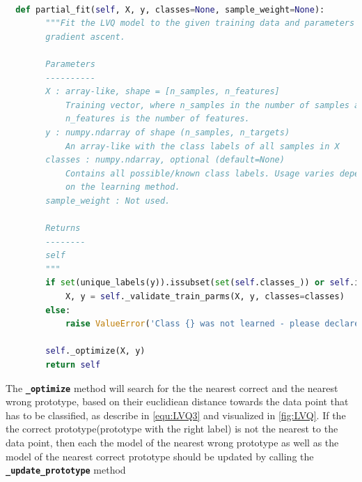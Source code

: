 \documentclass[12pt,oneside,a4paper,parskip]{scrbook}
\begin{document}
\begin{lstlisting}[label=lst:partialfit,
  language=python,
  firstnumber=1,
  caption=Method \texttt{partial\_fit} from the scikit-multiflow framework]			   

  def partial_fit(self, X, y, classes=None, sample_weight=None):
        """Fit the LVQ model to the given training data and parameters using
        gradient ascent.

        Parameters
        ----------
        X : array-like, shape = [n_samples, n_features]
            Training vector, where n_samples in the number of samples and
            n_features is the number of features.
        y : numpy.ndarray of shape (n_samples, n_targets)
            An array-like with the class labels of all samples in X
        classes : numpy.ndarray, optional (default=None)
            Contains all possible/known class labels. Usage varies depending
            on the learning method.
        sample_weight : Not used.

        Returns
        --------
        self
        """
        if set(unique_labels(y)).issubset(set(self.classes_)) or self.initial_fit is True:
            X, y = self._validate_train_parms(X, y, classes=classes)
        else:
            raise ValueError('Class {} was not learned - please declare all classes in first call of fit/partial_fit'.format(y))

        self._optimize(X, y)
        return self
\end{lstlisting}

The \textbf{\texttt{\_optimize}} method will search for the the nearest correct and the nearest wrong prototype, based on 
their euclidiean distance towards the data point that has to be classified, as describe in \ref{equ:LVQ3} and visualized in \ref{fig:LVQ}.
If the the correct prototype(prototype with the right label) is not the nearest to the data point, then each the model of the nearest wrong
prototype as well as the model of the nearest correct prototype should be updated by calling the \textbf{\texttt{\_update\_prototype}} method
\end{document}
